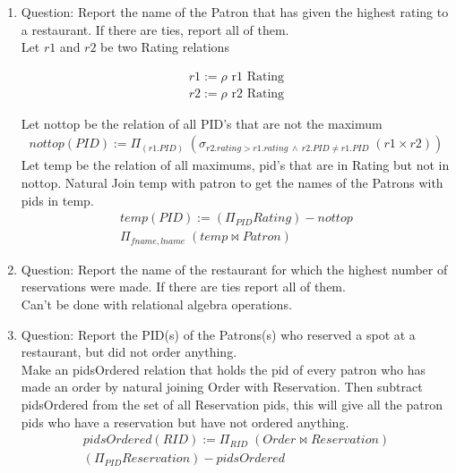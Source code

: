 \documentclass{article}
\begin{document}
\begin{enumerate}
    \item %
    Question: Report the name of the Patron that has given the highest rating to a restaurant. If there are ties,
report all of them.\\
    
        Let $r1$ and $r2$ be two Rating relations
        
        \begin{align}
        r1:= \rho \text{  r1 Rating}  \\
        r2:= \rho \text{  r2 Rating}
		\end{align}     
		
		 Let nottop be the relation of all PID's that are not the maximum
		\begin{align}
        nottop(PID):= \Pi_{(r1.PID)}\;(\sigma_{r2.rating > r1.rating \: \wedge \: r2.PID  \neq r1.PID}\;(r1 \times r2))
		\end{align} 
		Let temp be the relation of all maximums, pid's that are in Rating but not in nottop. Natural Join temp with patron to get the names of the Patrons with pids in temp.
		\begin{align}
        temp(PID):= 	(\Pi_{PID} Rating) - nottop\\
        \Pi_{fname,lname}\;(temp \bowtie Patron)
		\end{align} 
		
       
    \item %
        Question: Report the name of the restaurant for which the highest number of reservations were made. If there
are ties report all of them.\\

        Can't be done with relational algebra operations. 
    \item %
        Question: Report the PID(s) of the Patrons(s) who reserved a spot at a restaurant, but did not order anything.\\
        
        Make an pidsOrdered relation that holds the pid of every patron who has made an order by natural joining Order with Reservation. Then subtract pidsOrdered from the set of all Reservation pids, this will give all the patron pids who have a reservation but have not ordered anything.
        \begin{align}
        pidsOrdered(RID):= \Pi_{RID}\;(Order \bowtie Reservation)\\
        (\Pi_{PID} Reservation) - pidsOrdered
		\end{align} 
       

\end{enumerate}
\end{document}
